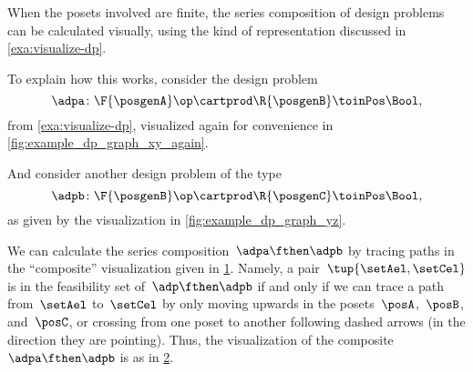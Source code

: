 When the posets involved are finite, the series composition of design problems can be calculated visually, using the kind of representation discussed in \cref{exa:visualize-dp}.
\begin{marginfigure}
    \centering
    \caption{ }
    \label{fig:example_dp_graph_xy_again}
\end{marginfigure}
To explain how this works, consider the design problem
\begin{equation}
    \adpa \colon \F{\posgenA} \op \cartprod  \R{\posgenB} \toinPos \Bool,
\end{equation}
from \cref{exa:visualize-dp}, visualized again for convenience in \cref{fig:example_dp_graph_xy_again}.
\begin{marginfigure}
    \centering
    \caption{ }
    \label{fig:example_dp_graph_yz}
\end{marginfigure}
And consider another design problem of the type
\begin{equation}
    \adpb \colon \F{\posgenB} \op \cartprod  \R{\posgenC} \toinPos \Bool,
\end{equation}
as given by the visualization in \cref{fig:example_dp_graph_yz}.

We can calculate the series composition~$\adpa \fthen \adpb$ by tracing paths in the ``composite'' visualization given in \cref{fig:example_dp_graph_xyz}.
Namely, a pair~$\tup{\setAel, \setCel}$ is in the feasibility set of~$\adp \fthen \adpb$ if and only if we can trace a path from~$\setAel$ to~$\setCel$ by only moving upwards in the posets~$\posA$,~$\posB$, and~$\posC$, or crossing from one poset to another following dashed arrows (in the direction they are pointing).
Thus, the visualization of the composite~$\adpa \fthen \adpb$ is as in \cref{fig:example_dp_graph_xz}.
\begin{figure}[h!]
    \centering
    \caption{}
    \label{fig:example_dp_graph_xyz}
\end{figure}
\begin{figure}[h!]
    \centering
    \caption{}
    \label{fig:example_dp_graph_xz}
\end{figure}


